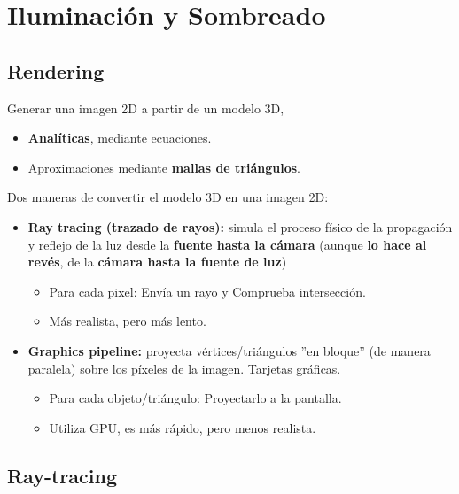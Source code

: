 \chapter{Iluminación y Sombreado}
\section{Rendering}
Generar una imagen 2D a partir de un modelo 3D,
\begin{itemize}
    \item \textbf{Analíticas}, mediante ecuaciones.
    \item Aproximaciones mediante \textbf{mallas de triángulos}.
\end{itemize}

Dos maneras de convertir el modelo 3D en una imagen 2D:
\begin{itemize}
    \item \textbf{Ray tracing (trazado de rayos):} simula el proceso físico de la propagación y reflejo de la luz desde la \textbf{fuente hasta la cámara} (aunque \textbf{lo hace al revés}, de la \textbf{cámara hasta la fuente de luz})
    \begin{itemize}
        \item Para cada pixel: Envía un rayo y Comprueba intersección.
        \item Más realista, pero más lento.
    \end{itemize}
    \item \textbf{Graphics pipeline:} proyecta vértices/triángulos ''en bloque'' (de manera paralela) sobre los píxeles de la imagen. Tarjetas gráficas.
    \begin{itemize}
        \item Para cada objeto/triángulo: Proyectarlo a la pantalla.
        \item Utiliza GPU, es más rápido, pero menos realista.
    \end{itemize}
\end{itemize}

\section{Ray-tracing}

